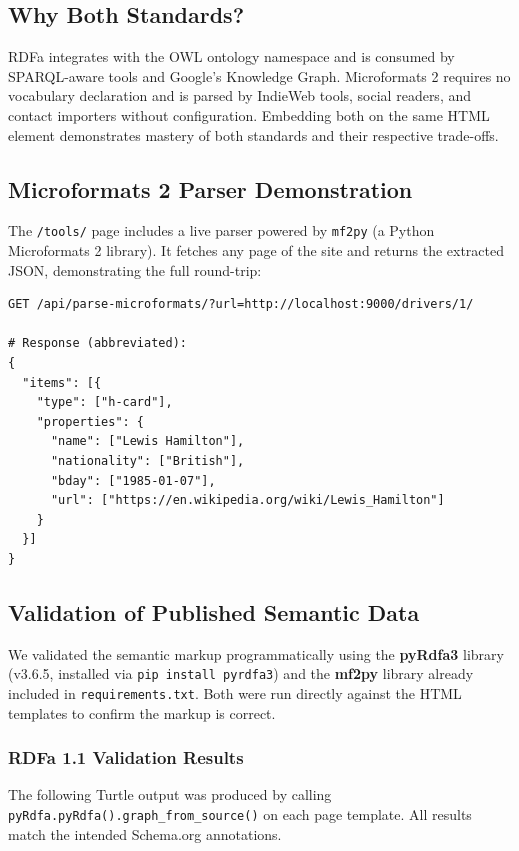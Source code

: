 \documentclass[12pt,a4paper]{article}
\begin{document}
\subsection{Why Both Standards?}

RDFa integrates with the OWL ontology namespace and is consumed by SPARQL-aware tools
and Google's Knowledge Graph. Microformats 2 requires no vocabulary declaration and
is parsed by IndieWeb tools, social readers, and contact importers without configuration.
Embedding both on the same HTML element demonstrates mastery of both standards and
their respective trade-offs.

\subsection{Microformats 2 Parser Demonstration}

The \texttt{/tools/} page includes a live parser powered by \texttt{mf2py} (a Python
Microformats 2 library). It fetches any page of the site and returns the extracted
JSON, demonstrating the full round-trip:

\begin{lstlisting}[style=shell, caption={Calling the live MF2 parser endpoint}]
GET /api/parse-microformats/?url=http://localhost:9000/drivers/1/

# Response (abbreviated):
{
  "items": [{
    "type": ["h-card"],
    "properties": {
      "name": ["Lewis Hamilton"],
      "nationality": ["British"],
      "bday": ["1985-01-07"],
      "url": ["https://en.wikipedia.org/wiki/Lewis_Hamilton"]
    }
  }]
}
\end{lstlisting}

\subsection{Validation of Published Semantic Data}
\label{sec:validation}

We validated the semantic markup programmatically using the \textbf{pyRdfa3} library
(v3.6.5, installed via \texttt{pip install pyrdfa3}) and the \textbf{mf2py} library
already included in \texttt{requirements.txt}. Both were run directly against the
HTML templates to confirm the markup is correct.

\subsubsection{RDFa 1.1 Validation Results}

The following Turtle output was produced by calling \texttt{pyRdfa.pyRdfa().graph\_from\_source()}
on each page template. All results match the intended Schema.org annotations.
\end{document}
